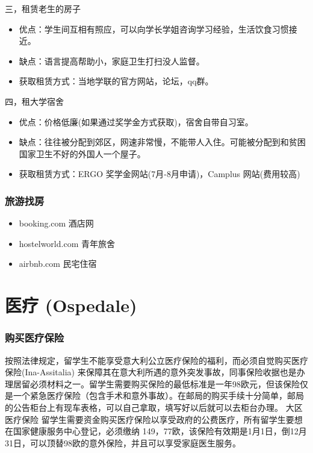 三，租赁老生的房子
\begin{itemize}
\item 优点：学生间互相有照应，可以向学长学姐咨询学习经验，生活饮食习惯接近。
\item 缺点：语言提高帮助小，家庭卫生打扫没人监督。
\item 获取租赁方式：当地学联的官方网站，论坛，qq群。
\end{itemize} 

四，租大学宿舍
\begin{itemize}
\item 优点：价格低廉(如果通过奖学金方式获取)，宿舍自带自习室。
\item 缺点：往往被分配到郊区，网速非常慢，不能带人入住。可能被分配到和贫困国家卫生不好的外国人一个屋子。
\item 获取租赁方式：ERGO 奖学金网站(7月-8月申请)，Camplus 网站(费用较高)
\end{itemize} 

\subsubsection{旅游找房}
\begin{itemize}
\item booking.com 酒店网
\item hostelworld.com 青年旅舍
\item airbnb.com 民宅住宿
\end{itemize} 


\section{医疗 (Ospedale)}


\subsubsection{购买医疗保险}

按照法律规定，留学生不能享受意大利公立医疗保险的福利，而必须自觉购买医疗保险(Ina-Assitalia) 来保障其在意大利所遇的意外突发事故，同事保险收据也是办理居留必须材料之一。留学生需要购买保险的最低标准是一年98欧元，但该保险仅是一个紧急医疗保险（包含手术和意外事故）。在邮局的购买手续十分简单，邮局的公告柜台上有现车表格，可以自己拿取，填写好以后就可以去柜台办理。
大区医疗保险
留学生需要资金购买医疗保险以享受政府的公费医疗，所有留学生要想在国家健康服务中心登记，必须缴纳 149，77欧，该保险有效期是1月1日，倒12月31日，可以顶替98欧的意外保险，并且可以享受家庭医生服务。

